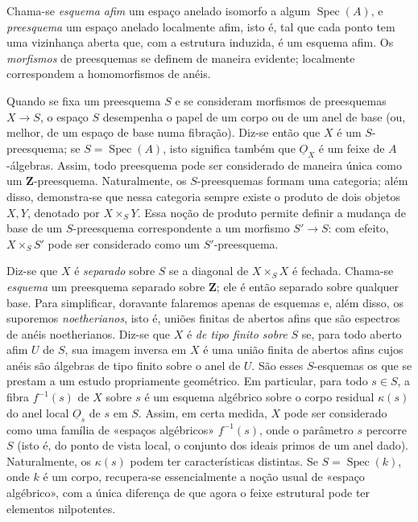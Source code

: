\documentclass[11pt,twoside,openany]{book}
\numberwithin{equation}{section}
\newcommand{\Osh}{\underline{O}}
\theoremstyle{plain}
\theoremstyle{definition}
\theoremstyle{remark}
\begin{document}
Chama-se \emph{esquema afim} um espaço anelado isomorfo a algum
$\operatorname{Spec}(A)$, e \emph{preesquema} um espaço anelado localmente
afim, isto é, tal que cada ponto tem uma vizinhança aberta que, com a
estrutura induzida, é um esquema afim. Os \emph{morfismos} de preesquemas se
definem de maneira evidente; localmente correspondem a homomorfismos de anéis.

Quando se fixa um preesquema $S$ e se consideram morfismos de preesquemas
$X\longrightarrow S$, o espaço $S$ desempenha o papel de um corpo ou de um
anel de base (ou, melhor, de um espaço de base numa fibração). Diz-se
então que $X$ é um $S$-preesquema; se $S=\operatorname{Spec}(A)$, isto
significa também que $\Osh_X$ é um feixe de $A$-álgebras. Assim, todo preesquema
pode ser considerado de maneira única como um $\mathbf Z$-preesquema. Naturalmente,
os $S$-preesquemas formam uma categoria; além disso, demonstra-se que nessa
categoria sempre existe o produto de dois objetos $X,Y$, denotado por
$X\times_S Y$. Essa noção de produto permite definir a mudança de base de um
$S$-preesquema correspondente a um morfismo $S'\longrightarrow S$: com efeito,
$X\times_S S'$ pode ser considerado como um $S'$-preesquema.

Diz-se que $X$ é \emph{separado} sobre $S$ se a diagonal de
$X\times_S X$ é fechada. Chama-se \emph{esquema} um preesquema separado
sobre $\mathbf Z$; ele é então separado sobre qualquer base. Para simplificar,
doravante falaremos apenas de esquemas e, além disso, os suporemos
\emph{noetherianos}, isto é, uniões finitas de abertos afins que são
espectros de anéis noetherianos. Diz-se que $X$ é \emph{de tipo finito
sobre} $S$ se, para todo aberto afim $U$ de $S$, sua imagem inversa em $X$ é
uma união finita de abertos afins cujos anéis são álgebras de tipo finito
sobre o anel de $U$. São esses $S$-esquemas os que se prestam a um estudo
propriamente geométrico. Em particular, para todo $s\in S$, a fibra
$f^{-1}(s)$ de $X$ sobre $s$ é um esquema algébrico sobre o corpo residual
$\kappa(s)$ do anel local $\Osh_s$ de $s$ em $S$. Assim, em certa medida, $X$
pode ser considerado como uma família de «espaços algébricos» $f^{-1}(s)$, onde
o parâmetro $s$ percorre $S$ (isto é, do ponto de vista local, o
conjunto dos ideais primos de um anel dado). Naturalmente, os
$\kappa(s)$ podem ter características distintas. Se
$S=\operatorname{Spec}(k)$, onde $k$ é um corpo, recupera-se essencialmente a
noção usual de «espaço algébrico», com a única diferença de que agora o
feixe estrutural pode ter elementos nilpotentes.
\end{document}
